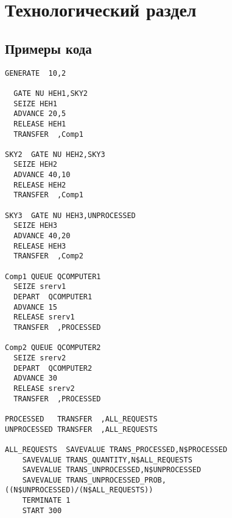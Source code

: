 \chapter{Технологический раздел}

\section{Примеры кода}

\begin{lstlisting}[caption={}]
  GENERATE  10,2  

  GATE NU HEH1,SKY2 
  SEIZE HEH1  
  ADVANCE 20,5  
  RELEASE HEH1
  TRANSFER  ,Comp1
  
SKY2  GATE NU HEH2,SKY3 
  SEIZE HEH2  
  ADVANCE 40,10 
  RELEASE HEH2
  TRANSFER  ,Comp1  

SKY3  GATE NU HEH3,UNPROCESSED  
  SEIZE HEH3  
  ADVANCE 40,20 
  RELEASE HEH3  
  TRANSFER  ,Comp2  
  
Comp1 QUEUE QCOMPUTER1  
  SEIZE srerv1  
  DEPART  QCOMPUTER1  
  ADVANCE 15  
  RELEASE srerv1  
  TRANSFER  ,PROCESSED  

Comp2 QUEUE QCOMPUTER2  
  SEIZE srerv2  
  DEPART  QCOMPUTER2  
  ADVANCE 30  
  RELEASE srerv2  
  TRANSFER  ,PROCESSED  

PROCESSED   TRANSFER  ,ALL_REQUESTS
UNPROCESSED TRANSFER  ,ALL_REQUESTS
                
ALL_REQUESTS  SAVEVALUE TRANS_PROCESSED,N$PROCESSED
    SAVEVALUE TRANS_QUANTITY,N$ALL_REQUESTS
    SAVEVALUE TRANS_UNPROCESSED,N$UNPROCESSED
    SAVEVALUE TRANS_UNPROCESSED_PROB,((N$UNPROCESSED)/(N$ALL_REQUESTS))
    TERMINATE 1
    START 300
\end{lstlisting}

